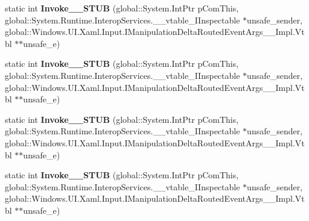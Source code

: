 \begin{DoxyCompactItemize}
\item 
\mbox{\label{struct_windows_1_1_u_i_1_1_xaml_1_1_input_1_1_manipulation_delta_event_handler_____impl_1_1_vtbl_ab3e2e71d4d944fd98d58c8ed8ed5c885}} 
static int {\bfseries Invoke\+\_\+\+\_\+\+S\+T\+UB} (global\+::\+System.\+Int\+Ptr p\+Com\+This, global\+::\+System.\+Runtime.\+Interop\+Services.\+\_\+\+\_\+vtable\+\_\+\+I\+Inspectable $\ast$unsafe\+\_\+sender, global\+::\+Windows.\+U\+I.\+Xaml.\+Input.\+I\+Manipulation\+Delta\+Routed\+Event\+Args\+\_\+\+\_\+\+Impl.\+Vtbl $\ast$$\ast$unsafe\+\_\+e)
\item 
\mbox{\label{struct_windows_1_1_u_i_1_1_xaml_1_1_input_1_1_manipulation_delta_event_handler_____impl_1_1_vtbl_ab3e2e71d4d944fd98d58c8ed8ed5c885}} 
static int {\bfseries Invoke\+\_\+\+\_\+\+S\+T\+UB} (global\+::\+System.\+Int\+Ptr p\+Com\+This, global\+::\+System.\+Runtime.\+Interop\+Services.\+\_\+\+\_\+vtable\+\_\+\+I\+Inspectable $\ast$unsafe\+\_\+sender, global\+::\+Windows.\+U\+I.\+Xaml.\+Input.\+I\+Manipulation\+Delta\+Routed\+Event\+Args\+\_\+\+\_\+\+Impl.\+Vtbl $\ast$$\ast$unsafe\+\_\+e)
\item 
\mbox{\label{struct_windows_1_1_u_i_1_1_xaml_1_1_input_1_1_manipulation_delta_event_handler_____impl_1_1_vtbl_ab3e2e71d4d944fd98d58c8ed8ed5c885}} 
static int {\bfseries Invoke\+\_\+\+\_\+\+S\+T\+UB} (global\+::\+System.\+Int\+Ptr p\+Com\+This, global\+::\+System.\+Runtime.\+Interop\+Services.\+\_\+\+\_\+vtable\+\_\+\+I\+Inspectable $\ast$unsafe\+\_\+sender, global\+::\+Windows.\+U\+I.\+Xaml.\+Input.\+I\+Manipulation\+Delta\+Routed\+Event\+Args\+\_\+\+\_\+\+Impl.\+Vtbl $\ast$$\ast$unsafe\+\_\+e)
\item 
\mbox{\label{struct_windows_1_1_u_i_1_1_xaml_1_1_input_1_1_manipulation_delta_event_handler_____impl_1_1_vtbl_ab3e2e71d4d944fd98d58c8ed8ed5c885}} 
static int {\bfseries Invoke\+\_\+\+\_\+\+S\+T\+UB} (global\+::\+System.\+Int\+Ptr p\+Com\+This, global\+::\+System.\+Runtime.\+Interop\+Services.\+\_\+\+\_\+vtable\+\_\+\+I\+Inspectable $\ast$unsafe\+\_\+sender, global\+::\+Windows.\+U\+I.\+Xaml.\+Input.\+I\+Manipulation\+Delta\+Routed\+Event\+Args\+\_\+\+\_\+\+Impl.\+Vtbl $\ast$$\ast$unsafe\+\_\+e)

\end{DoxyCompactItemize}

